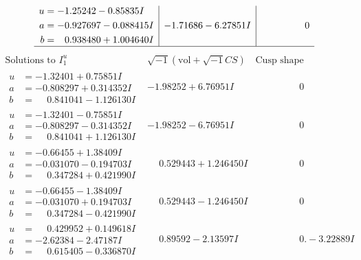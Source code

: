 \documentclass[1p]{elsarticle_modified}
\theoremstyle{definition}
\newcommand{\I}{\sqrt{-1}}
\begin{document}
$$\begin{array}{c|c|c}
\begin{aligned}
u &= -1.25242 - 0.85835 I \\
a &= -0.927697 - 0.088415 I \\
b &= \phantom{-}0.938480 + 1.004640 I\end{aligned}
 & -1.71686 - 6.27851 I & \phantom{-0.000000 } 0\\
 \hline 
 \end{array}$$\newpage$$\begin{array}{c|c|c}  
\text{Solutions to }I^u_{1}& \I (\text{vol} + \sqrt{-1}CS) & \text{Cusp shape}\\
 \hline 
\begin{aligned}
u &= -1.32401 + 0.75851 I \\
a &= -0.808297 + 0.314352 I \\
b &= \phantom{-}0.841041 - 1.126130 I\end{aligned}
 & -1.98252 + 6.76951 I & \phantom{-0.000000 } 0 \\ \hline\begin{aligned}
u &= -1.32401 - 0.75851 I \\
a &= -0.808297 - 0.314352 I \\
b &= \phantom{-}0.841041 + 1.126130 I\end{aligned}
 & -1.98252 - 6.76951 I & \phantom{-0.000000 } 0 \\ \hline\begin{aligned}
u &= -0.66455 + 1.38409 I \\
a &= -0.031070 - 0.194703 I \\
b &= \phantom{-}0.347284 + 0.421990 I\end{aligned}
 & \phantom{-}0.529443 + 1.246450 I & \phantom{-0.000000 } 0 \\ \hline\begin{aligned}
u &= -0.66455 - 1.38409 I \\
a &= -0.031070 + 0.194703 I \\
b &= \phantom{-}0.347284 - 0.421990 I\end{aligned}
 & \phantom{-}0.529443 - 1.246450 I & \phantom{-0.000000 } 0 \\ \hline\begin{aligned}
u &= \phantom{-}0.429952 + 0.149618 I \\
a &= -2.62384 - 2.47187 I \\
b &= \phantom{-}0.615405 - 0.336870 I\end{aligned}
 & \phantom{-}0.89592 - 2.13597 I & \phantom{-0.000000 } 0. - 3.22889 I \\ \hline\begin{aligned}

\end{aligned}
\end{array}$$
\end{document}
